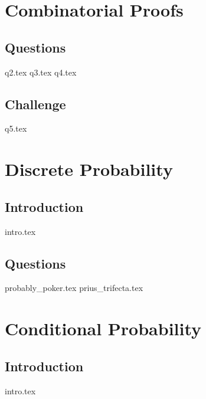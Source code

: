 \documentclass{exam}
\begin{document}
\newpage

\section{Combinatorial Proofs}
\subsection{Questions}
\begin{questions}
{q2.tex}
{q3.tex}
{q4.tex}
\end{questions}
\subsection{Challenge}
\begin{questions}
{q5.tex}
\end{questions}

\newpage 

\section{Discrete Probability}
\subsection{Introduction}
{intro.tex}
\subsection{Questions}
\begin{questions}
{probably_poker.tex}
{prius_trifecta.tex}
\end{questions}

\newpage

\section{Conditional Probability}
\subsection{Introduction}
{intro.tex}
\end{document}
